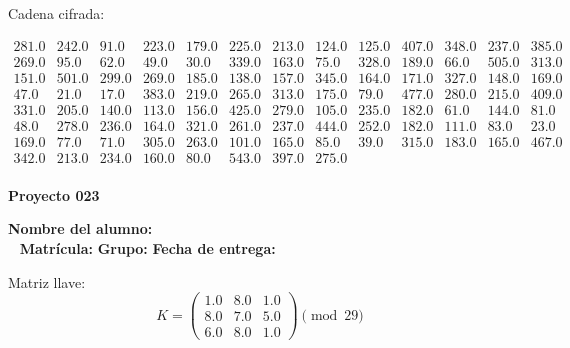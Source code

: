 \documentclass[12pt]{article}
\begin{document}
Cadena cifrada:
\begin{center}
$\begin{array}{lllllllllllll}
281.0 & 242.0 & 91.0 & 223.0 & 179.0 & 225.0 & 213.0 & 124.0 & 125.0 & 407.0 & 348.0 & 237.0 & 385.0\\
269.0 & 95.0 & 62.0 & 49.0 & 30.0 & 339.0 & 163.0 & 75.0 & 328.0 & 189.0 & 66.0 & 505.0 & 313.0\\
151.0 & 501.0 & 299.0 & 269.0 & 185.0 & 138.0 & 157.0 & 345.0 & 164.0 & 171.0 & 327.0 & 148.0 & 169.0\\
47.0 & 21.0 & 17.0 & 383.0 & 219.0 & 265.0 & 313.0 & 175.0 & 79.0 & 477.0 & 280.0 & 215.0 & 409.0\\
331.0 & 205.0 & 140.0 & 113.0 & 156.0 & 425.0 & 279.0 & 105.0 & 235.0 & 182.0 & 61.0 & 144.0 & 81.0\\
48.0 & 278.0 & 236.0 & 164.0 & 321.0 & 261.0 & 237.0 & 444.0 & 252.0 & 182.0 & 111.0 & 83.0 & 23.0\\
169.0 & 77.0 & 71.0 & 305.0 & 263.0 & 101.0 & 165.0 & 85.0 & 39.0 & 315.0 & 183.0 & 165.0 & 467.0\\
342.0 & 213.0 & 234.0 & 160.0 & 80.0 & 543.0 & 397.0 & 275.0\\
\end{array}$
\end{center}

\newpage


\textbf{Proyecto 023}

\textbf{Nombre del alumno:} \underline{\hspace{13cm}}\\\
\vspace{1cm}
\textbf{Matrícula:} \underline{\hspace{4cm}} \hspace{1cm}
\textbf{Grupo:} \underline{\hspace{2cm}}
\textbf{Fecha de entrega:} \underline{\hspace{2cm}}

\medskip

Matriz llave:
\[
K = \begin{pmatrix}
1.0 & 8.0 & 1.0\\
8.0 & 7.0 & 5.0\\
6.0 & 8.0 & 1.0
\end{pmatrix} \pmod{29}
\]
\end{document}
